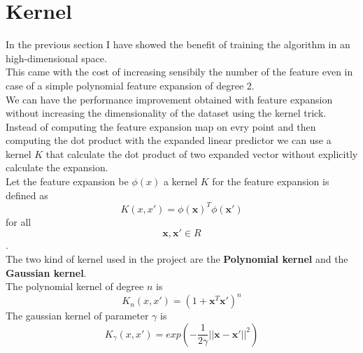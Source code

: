 \newpage
\section{Kernel}
In the previous section I have showed the benefit of training the algorithm in an high-dimensional space.\\
This came with the cost of increasing sensibily the number of the feature even in case of a simple polynomial feature expansion of degree 2.\\
We can have the performance improvement obtained with feature expansion without increasing the dimensionality of the dataset using the kernel trick.\\
Instead of computing the feature expansion map on evry point and then computing the dot product with the expanded linear predictor we can use a kernel $K$ that calculate the dot product of two expanded vector without explicitly calculate the expansion.\\
Let the feature expansion be $\phi(x)$ a kernel $K$ for the feature expansion is defined as $$K(x, x') = \phi(\boldsymbol{x})^T \phi(\boldsymbol{x'})$$   for all $$\boldsymbol{x}, \boldsymbol{x'} \in R$$.\\
The two kind of kernel used in the project are the \textbf{Polynomial kernel} and the \textbf{Gaussian kernel}.\\
The polynomial kernel of degree $n$ is $$K_n(x, x') = (1 + \boldsymbol{x}^T \boldsymbol{x'})^n$$
The gaussian kernel of parameter $\gamma$ is $$K_\gamma(x, x') = exp(-\frac{1}{2\gamma}||\boldsymbol{x} - \boldsymbol{x'}||^2)$$
